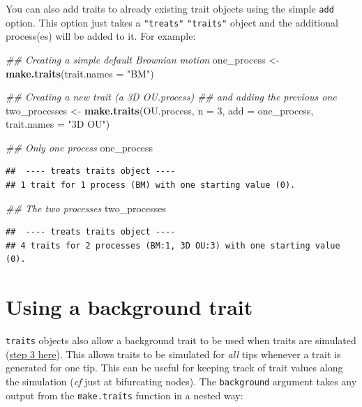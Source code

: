 \documentclass[
]{book}
\newenvironment{Shaded}{\begin{snugshade}}{\end{snugshade}}
\newcommand{\CommentTok}[1]{\textcolor[rgb]{0.56,0.35,0.01}{\textit{#1}}}
\newcommand{\DataTypeTok}[1]{\textcolor[rgb]{0.13,0.29,0.53}{#1}}
\newcommand{\DecValTok}[1]{\textcolor[rgb]{0.00,0.00,0.81}{#1}}
\newcommand{\KeywordTok}[1]{\textcolor[rgb]{0.13,0.29,0.53}{\textbf{#1}}}
\newcommand{\NormalTok}[1]{#1}
\newcommand{\StringTok}[1]{\textcolor[rgb]{0.31,0.60,0.02}{#1}}
\begin{document}
You can also add traits to already existing trait objects using the simple \texttt{add} option.
This option just takes a \texttt{"treats"} \texttt{"traits"} object and the additional process(es) will be added to it.
For example:

\begin{Shaded}
\begin{Highlighting}[]
\CommentTok{\#\# Creating a simple default Brownian motion}
\NormalTok{one\_process \textless{}{-}}\StringTok{ }\KeywordTok{make.traits}\NormalTok{(}\DataTypeTok{trait.names =} \StringTok{"BM"}\NormalTok{)}

\CommentTok{\#\# Creating a new trait (a 3D OU.process)}
\CommentTok{\#\# and adding the previous one}
\NormalTok{two\_processes \textless{}{-}}\StringTok{ }\KeywordTok{make.traits}\NormalTok{(OU.process, }\DataTypeTok{n =} \DecValTok{3}\NormalTok{, }\DataTypeTok{add =}\NormalTok{ one\_process,}
                             \DataTypeTok{trait.names =} \StringTok{"3D OU"}\NormalTok{)}

\CommentTok{\#\# Only one process}
\NormalTok{one\_process}
\end{Highlighting}
\end{Shaded}

\begin{verbatim}
##  ---- treats traits object ---- 
## 1 trait for 1 process (BM) with one starting value (0).
\end{verbatim}

\begin{Shaded}
\begin{Highlighting}[]
\CommentTok{\#\# The two processes}
\NormalTok{two\_processes}
\end{Highlighting}
\end{Shaded}

\begin{verbatim}
##  ---- treats traits object ---- 
## 4 traits for 2 processes (BM:1, 3D OU:3) with one starting value (0).
\end{verbatim}

\hypertarget{using-a-background-trait}{%
\section{Using a background trait}\label{using-a-background-trait}}

\texttt{traits} objects also allow a background trait to be used when traits are simulated (\protect\hyperlink{bdalgorithm}{step 3 here}).
This allows traits to be simulated for \emph{all} tips whenever a trait is generated for one tip.
This can be useful for keeping track of trait values along the simulation (\emph{cf} just at bifurcating nodes).
The \texttt{background} argument takes any output from the \texttt{make.traits} function in a nested way:
\end{document}
